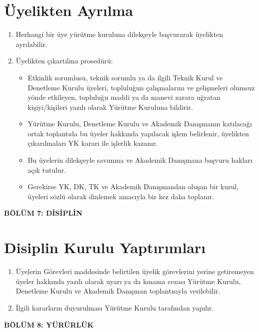 \documentclass[11pt,a4paper]{article}
\begin{document}
\section{Üyelikten Ayrılma}
\begin{enumerate}
    \item Herhangi bir üye yürütme kuruluna dilekçeyle başvurarak üyelikten ayrılabilir.
    \item Üyelikten çıkartılma prosedürü:
    \begin{itemize}
        \item Etkinlik sorumlusu, teknik sorumlu ya da ilgili Teknik Kurul ve Denetleme Kurulu üyeleri, topluluğun çalışmalarını ve gelişmeleri olumsuz yönde etkileyen, topluluğu maddi ya da manevi zarara uğratan kişiyi/kişileri yazılı olarak Yürütme Kuruluna bildirir.
        \item Yürütme Kurulu, Denetleme Kurulu ve Akademik Danışmanın katılacağı ortak toplantıda bu üyeler hakkında yapılacak işlem belirlenir, üyelikten çıkarılmaları YK kararı ile işlerlik kazanır.
        \item Bu üyelerin dilekçeyle savunma ve Akademik Danışmana başvuru hakları açık tutulur.
        \item Gerekirse YK, DK, TK ve Akademik Danışmandan oluşan bir kurul, üyeleri sözlü olarak dinlemek amacıyla bir kez daha toplanır.
    \end{itemize}
\end{enumerate}

\begin{center}
    {\Large \textbf{BÖLÜM 7: DİSİPLİN}}
\end{center}
\vspace{0.5cm}

\section{Disiplin Kurulu Yaptırımları}
\begin{enumerate}
    \item Üyelerin Görevleri maddesinde belirtilen üyelik görevlerini yerine getiremeyen üyeler hakkında yazılı olarak uyarı ya da kınama cezası Yürütme Kurulu, Denetleme Kurulu ve Akademik Danışman toplantısıyla verilebilir.
    \item İlgili kararların duyurulması Yürütme Kurulu tarafından yapılır.
\end{enumerate}

\begin{center}
    {\Large \textbf{BÖLÜM 8: YÜRÜRLÜK}}
\end{center}
\vspace{0.5cm}
\end{document}
